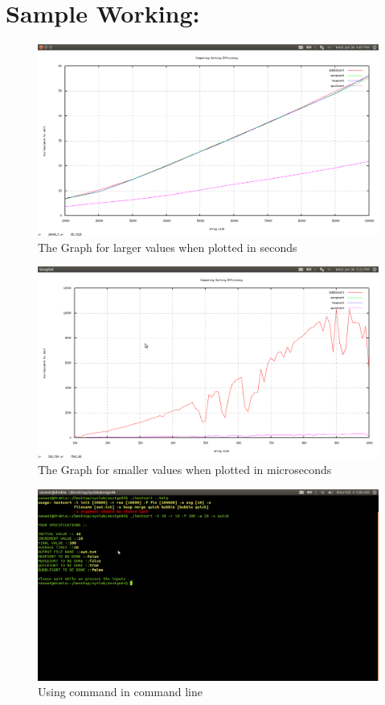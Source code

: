 \documentclass[a4paper,11pt]{article}
\begin{document}
\section{Sample Working:}
\begin{figure}[ht!]
\centering
\includegraphics[width=120mm]{output.png}
\caption{The Graph for larger values when plotted in seconds}
\label{output1}
\end{figure}
\begin{figure}[ht!]
\centering
\includegraphics[width=120mm]{output1.png}
\caption{The Graph for smaller values when plotted in microseconds}
\label{output}
\end{figure}
\begin{figure}[ht!]
\centering
\includegraphics[width=120mm]{output3.png}
\caption{Using command in command line}
\label{output3}
\end{figure}
\end{document}
